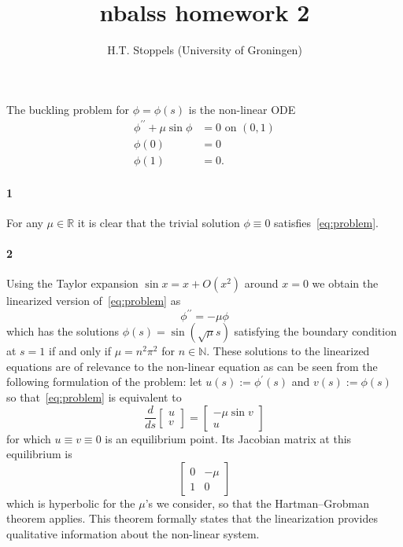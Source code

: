 \documentclass[a4paper]{article}
\author{H.T. Stoppels (University of Groningen)}
\title{{\sc nbalss} homework 2}
\begin{document}
  \maketitle
  
  \noindent The buckling problem for $\phi = \phi(s)$ is the non-linear ODE
  \begin{equation}\label{eq:problem}
  \begin{aligned}
    \phi^{\prime\prime} + \mu \sin \phi &= 0 \text{ on } (0, 1) \\
    \phi(0) &= 0 \\
    \phi(1) &= 0.
  \end{aligned}
  \end{equation}

  \paragraph{1} For any $\mu \in \mathbb{R}$ it is clear that the trivial solution $\phi \equiv 0$ satisfies~\eqref{eq:problem}.

  \paragraph{2} Using the Taylor expansion $\sin x = x + O(x^2)$ around $x = 0$ we obtain the linearized version of~\eqref{eq:problem} as $$\phi^{\prime\prime} = - \mu \phi$$
  which has the solutions $\phi(s) = \sin(\sqrt{\mu}s)$ satisfying the boundary condition at $s = 1$ if and only if $\mu = n^2\pi^2$ for $n \in \mathbb{N}.$ These solutions to the linearized equations are of relevance to the non-linear equation as can be seen from the following formulation of the problem: let $u(s) := \phi^\prime(s)$ and $v(s) := \phi(s)$ so that~\eqref{eq:problem} is equivalent to
  \begin{equation}
    \frac{d}{ds} \begin{bmatrix}
      u \\ v
    \end{bmatrix}
    =
    \begin{bmatrix}
      -\mu \sin v \\
      u
    \end{bmatrix}
  \end{equation}
  for which $u \equiv v \equiv 0$ is an equilibrium point. Its Jacobian matrix at this equilibrium is
  \begin{equation}
    \begin{bmatrix}
      0 & -\mu \\
      1 & 0
    \end{bmatrix}
  \end{equation}
  which is hyperbolic for the $\mu$'s we consider, so that the Hartman--Grobman theorem applies. This theorem formally states that the linearization provides qualitative information about the non-linear system.
\end{document}
